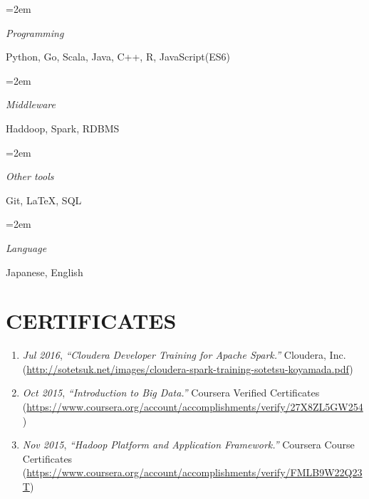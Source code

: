 \documentclass[paper=a4,fontsize=11pt]{scrartcl} %
\newlength{\spacebox}
\newcommand{\NewPart}[1]{\section*{\uppercase{#1}}}
\newcommand{\PersonalEntry}[2]{
		\noindent\hangindent=2em\hangafter=0 %
		\parbox{\spacebox}{        %
		\textit{#1}}		       %
		\hspace{1.5em} #2 \par}    %
\newcommand{\SkillsEntry}[2]{      %
		\noindent\hangindent=2em\hangafter=0 %
		\parbox{\spacebox}{        %
		\textit{#1}}			   %
		\hspace{1.5em} #2 \par}    %
\begin{document}

\SkillsEntry{Programming}{Python, Go, Scala, Java, C++, R, JavaScript(ES6)}
\SkillsEntry{Middleware}{Haddoop, Spark, RDBMS}
\SkillsEntry{Other tools}{Git, LaTeX, SQL}
\SkillsEntry{Language}{Japanese, English}

\NewPart{Certificates}{}

\begin{enumerate}
	\item {\em Jul 2016}, {\em ``Cloudera Developer Training for Apache Spark.''} Cloudera, Inc. \\{\footnotesize (\url{http://sotetsuk.net/images/cloudera-spark-training-sotetsu-koyamada.pdf})}
	\item {\em Oct 2015}, {\em ``Introduction to Big Data.''} Coursera Verified Certificates \\{\footnotesize (\url{https://www.coursera.org/account/accomplishments/verify/27X8ZL5GW254})}
	\item {\em Nov 2015}, {\em ``Hadoop Platform and Application Framework.''} Coursera Course Certificates \\{\footnotesize (\url{https://www.coursera.org/account/accomplishments/verify/FMLB9W22Q23T})}
\end{enumerate}
\end{document}
